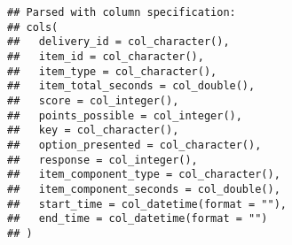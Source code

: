 \documentclass[]{book}
\newenvironment{Shaded}{\begin{snugshade}}{\end{snugshade}}
\newcommand{\KeywordTok}[1]{\textcolor[rgb]{0.13,0.29,0.53}{\textbf{#1}}}
\newcommand{\DataTypeTok}[1]{\textcolor[rgb]{0.13,0.29,0.53}{#1}}
\newcommand{\StringTok}[1]{\textcolor[rgb]{0.31,0.60,0.02}{#1}}
\newcommand{\OperatorTok}[1]{\textcolor[rgb]{0.81,0.36,0.00}{\textbf{#1}}}
\newcommand{\NormalTok}[1]{#1}
\theoremstyle{definition}
\theoremstyle{definition}
\theoremstyle{definition}
\theoremstyle{remark}
\begin{document}
\begin{verbatim}
## Parsed with column specification:
## cols(
##   delivery_id = col_character(),
##   item_id = col_character(),
##   item_type = col_character(),
##   item_total_seconds = col_double(),
##   score = col_integer(),
##   points_possible = col_integer(),
##   key = col_character(),
##   option_presented = col_character(),
##   response = col_integer(),
##   item_component_type = col_character(),
##   item_component_seconds = col_double(),
##   start_time = col_datetime(format = ""),
##   end_time = col_datetime(format = "")
## )
\end{verbatim}

\begin{Shaded}
\end{Shaded}
\end{document}

